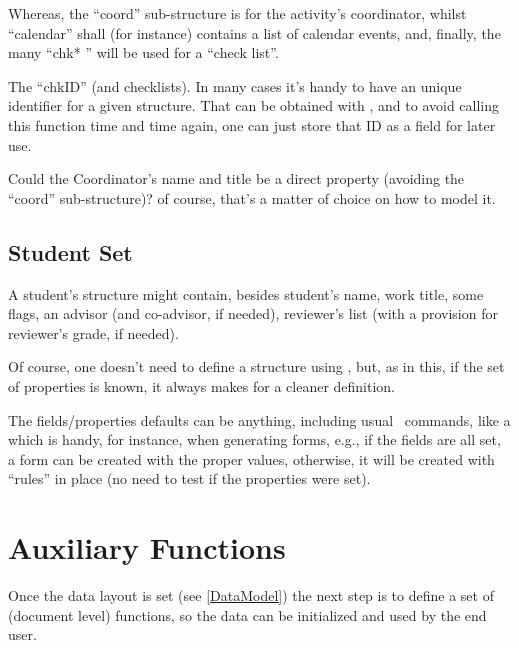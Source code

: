 \documentclass[10pt]{article}
\begin{document}


Whereas, the ``coord'' sub-structure is for the activity's coordinator, whilst ``calendar'' shall (for instance) contains a list of calendar events, and, finally, the many ``chk* '' will be used for a ``check list''.

\begin{tsremark}
The ``chkID'' (and checklists). In many cases it's handy to have an unique identifier for a given structure. That can be obtained with , and to avoid calling this function time and time again, one can just store that ID as a field for later use.
\end{tsremark}
\begin{tsremark}
  Could the Coordinator's name and title be a direct property (avoiding the ``coord'' sub-structure)? of course, that's a matter of choice on how to model it.
\end{tsremark}





\subsection{Student Set}\label{student:DataModel}
A student's structure might contain, besides student's name, work title, some flags, an advisor (and co-advisor, if needed), reviewer's list (with a provision for reviewer's grade, if needed).

Of course, one doesn't need to define a  structure using , but, as in this,  if the set of properties is known, it always makes for a cleaner definition.

\begin{tsremark}
  The fields/properties defaults can be anything, including usual \LaTeXe\  commands, like a \tsobj{\rule} which is handy, for instance, when generating forms, e.g., if the fields are all set, a form can be created with the proper values, otherwise, it will be  created with ``rules'' in place (no need to test if the properties were set).
\end{tsremark}









\section{Auxiliary Functions}
Once the data layout is set (see \ref{DataModel}) the next step is to define a set of (document level) functions, so the data can be initialized and used by the end user.
\end{document}
